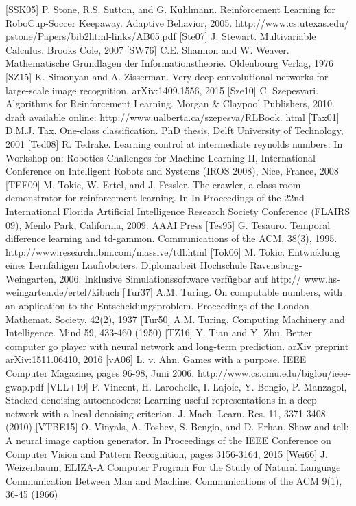 \documentclass[10pt]{book}
\begin{document}
[SSK05] P. Stone, R.S. Sutton, and G. Kuhlmann. Reinforcement Learning for RoboCup-Soccer Keepaway. Adaptive Behavior, 2005. http://www.cs.utexas.edu/ pstone/Papers/bib2html-links/AB05.pdf
[Ste07] J. Stewart. Multivariable Calculus. Brooks Cole, 2007
[SW76] C.E. Shannon and W. Weaver. Mathematische Grundlagen der Informationstheorie. Oldenbourg Verlag, 1976
[SZ15] K. Simonyan and A. Zisserman. Very deep convolutional networks for large-scale image recognition. arXiv:1409.1556, 2015
[Sze10] C. Szepesvari. Algorithms for Reinforcement Learning. Morgan \& Claypool Publishers, 2010. draft available online: http://www.ualberta.ca/szepesva/RLBook. html
[Tax01] D.M.J. Tax. One-class classification. PhD thesis, Delft University of Technology, 2001
[Ted08] R. Tedrake. Learning control at intermediate reynolds numbers. In Workshop on: Robotics Challenges for Machine Learning II, International Conference on Intelligent Robots and Systems (IROS 2008), Nice, France, 2008
[TEF09] M. Tokic, W. Ertel, and J. Fessler. The crawler, a class room demonstrator for reinforcement learning. In In Proceedings of the 22nd International Florida Artificial Intelligence Research Society Conference (FLAIRS 09), Menlo Park, California, 2009. AAAI Press
[Tes95] G. Tesauro. Temporal difference learning and td-gammon. Communications of the ACM, 38(3), 1995. http://www.research.ibm.com/massive/tdl.html
[Tok06] M. Tokic. Entwicklung eines Lernfähigen Laufroboters. Diplomarbeit Hochschule Ravensburg-Weingarten, 2006. Inklusive Simulationssoftware verfügbar auf http:// www.hs-weingarten.de/ertel/kibuch
[Tur37] A.M. Turing. On computable numbers, with an application to the Entscheidungsproblem. Proceedings of the London Mathemat. Society, 42(2), 1937
[Tur50] A.M. Turing, Computing Machinery and Intelligence. Mind 59, 433-460 (1950)
[TZ16] Y. Tian and Y. Zhu. Better computer go player with neural network and long-term prediction. arXiv preprint arXiv:1511.06410, 2016
[vA06] L. v. Ahn. Games with a purpose. IEEE Computer Magazine, pages 96-98, Juni 2006. http://www.cs.cmu.edu/biglou/ieee-gwap.pdf
[VLL+10] P. Vincent, H. Larochelle, I. Lajoie, Y. Bengio, P. Manzagol, Stacked denoising autoencoders: Learning useful representations in a deep network with a local denoising criterion. J. Mach. Learn. Res. 11, 3371-3408 (2010)
[VTBE15] O. Vinyals, A. Toshev, S. Bengio, and D. Erhan. Show and tell: A neural image caption generator. In Proceedings of the IEEE Conference on Computer Vision and Pattern Recognition, pages 3156-3164, 2015
[Wei66] J. Weizenbaum, ELIZA-A Computer Program For the Study of Natural Language Communication Between Man and Machine. Communications of the ACM 9(1), 36-45 (1966)
\end{document}
